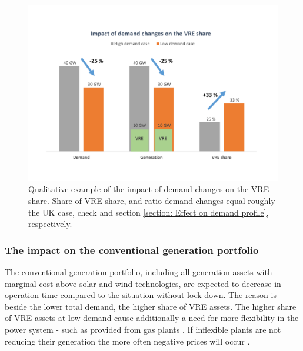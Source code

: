 \documentclass[energies,article,submit,moreauthors,pdftex]{Definitions/mdpi}
\begin{document}
\begin{figure}[H]
\centering
\hspace{-25pt}\includegraphics[trim={0cm 2cm 0cm 2cm},clip,width=1\textwidth]{Graphics/Illustrative-VRE-share-increase.pdf}
\caption{Qualitative example of the impact of demand changes on the VRE share. Share of VRE share, and ratio demand changes equal roughly the UK case, check \protect\cite{ENTSO-E2020ENTSO-EPlatform} and section \protect\ref{section: Effect on demand profile}, respectively.}
\label{fig:generation_effects}
\end{figure} 

\subsubsection{The impact on the conventional generation portfolio}

The conventional generation portfolio, including all generation assets with marginal cost above solar and wind technologies, are expected to decrease in operation time compared to the situation without lock-down. The reason is beside the lower total demand, the higher share of VRE assets. The higher share of VRE assets at low demand cause additionally a need for more flexibility in the power system - such as provided from gas plants \cite{Hirth2014TheVariability}. If inflexible plants are not reducing their generation the more often negative prices will occur \cite{IEA2016Re-poweringSystems.,Cochran2013MarketSystems}.

\end{document}

